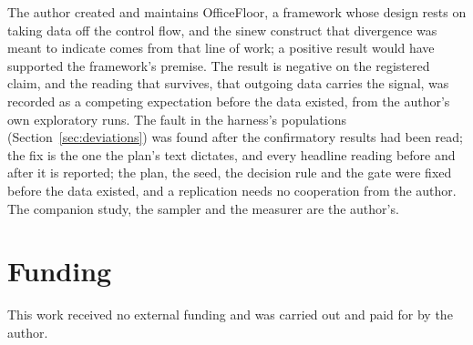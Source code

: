 \documentclass[11pt,a4paper]{article}
\begin{document}
The author created and maintains OfficeFloor, a framework whose design
rests on taking data off the control flow, and the sinew construct that
divergence was meant to indicate comes from that line of work; a positive
result would have supported the framework's premise. The result is
negative on the registered claim, and the reading that survives, that
outgoing data carries the signal, was recorded as a competing expectation
before the data existed, from the author's own exploratory runs. The
fault in the harness's populations (Section~\ref{sec:deviations}) was
found after the confirmatory results had been read; the fix is the one the
plan's text dictates, and every headline reading before and after it is
reported; the plan, the seed, the decision rule
and the gate were fixed before the data existed, and a replication needs no
cooperation from the author. The companion study, the sampler and the
measurer are the author's.

\section*{Funding}

This work received no external funding and was carried out and paid for by
the author.
\end{document}
